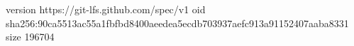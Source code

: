 version https://git-lfs.github.com/spec/v1
oid sha256:90ca5513ac55a1fbfbd8400aeedea5ecdb703937aefc913a91152407aaba8331
size 196704

